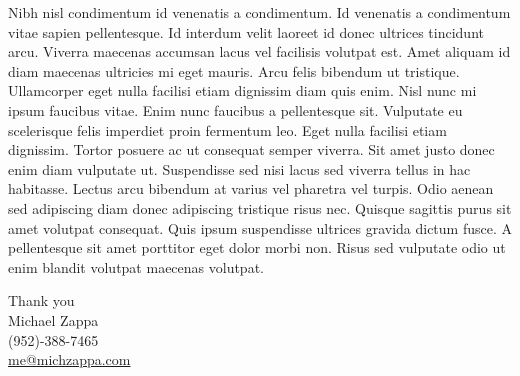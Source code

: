 \documentclass[11pt,a4]{article}
\begin{document}
Nibh nisl condimentum id venenatis a condimentum. Id venenatis a condimentum vitae sapien pellentesque. Id interdum velit laoreet id donec ultrices tincidunt arcu. Viverra maecenas accumsan lacus vel facilisis volutpat est. Amet aliquam id diam maecenas ultricies mi eget mauris. Arcu felis bibendum ut tristique. Ullamcorper eget nulla facilisi etiam dignissim diam quis enim. Nisl nunc mi ipsum faucibus vitae. Enim nunc faucibus a pellentesque sit. Vulputate eu scelerisque felis imperdiet proin fermentum leo. Eget nulla facilisi etiam dignissim. Tortor posuere ac ut consequat semper viverra. Sit amet justo donec enim diam vulputate ut. Suspendisse sed nisi lacus sed viverra tellus in hac habitasse. Lectus arcu bibendum at varius vel pharetra vel turpis. Odio aenean sed adipiscing diam donec adipiscing tristique risus nec. Quisque sagittis purus sit amet volutpat consequat. Quis ipsum suspendisse ultrices gravida dictum fusce. A pellentesque sit amet porttitor eget dolor morbi non. Risus sed vulputate odio ut enim blandit volutpat maecenas volutpat. \par


\vspace{0.5cm}
\raggedright
Thank you \\ Michael Zappa \\ (952)-388-7465 \\ \href{mailto:me@michzappa.com}{me@michzappa.com}
\end{document}
